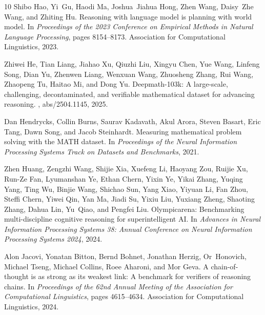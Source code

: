 \documentclass{article}
\begin{document}
{\begin{thebibliography}{10}
        Shibo Hao, Yi~Gu, Haodi Ma, Joshua~Jiahua Hong, Zhen Wang, Daisy~Zhe Wang, and Zhiting Hu.
        \newblock Reasoning with language model is planning with world model.
        \newblock In {\em Proceedings of the 2023 Conference on Empirical Methods in Natural Language Processing}, pages 8154--8173. Association for Computational Linguistics, 2023.
        
        Zhiwei He, Tian Liang, Jiahao Xu, Qiuzhi Liu, Xingyu Chen, Yue Wang, Linfeng Song, Dian Yu, Zhenwen Liang, Wenxuan Wang, Zhuosheng Zhang, Rui Wang, Zhaopeng Tu, Haitao Mi, and Dong Yu.
        \newblock Deepmath-103k: A large-scale, challenging, decontaminated, and verifiable mathematical dataset for advancing reasoning.
        , abs/2504.1145, 2025.
        
        Dan Hendrycks, Collin Burns, Saurav Kadavath, Akul Arora, Steven Basart, Eric Tang, Dawn Song, and Jacob Steinhardt.
        \newblock Measuring mathematical problem solving with the {MATH} dataset.
        \newblock In {\em Proceedings of the Neural Information Processing Systems Track on Datasets and Benchmarks}, 2021.
        
        Zhen Huang, Zengzhi Wang, Shijie Xia, Xuefeng Li, Haoyang Zou, Ruijie Xu, Run{-}Ze Fan, Lyumanshan Ye, Ethan Chern, Yixin Ye, Yikai Zhang, Yuqing Yang, Ting Wu, Binjie Wang, Shichao Sun, Yang Xiao, Yiyuan Li, Fan Zhou, Steffi Chern, Yiwei Qin, Yan Ma, Jiadi Su, Yixiu Liu, Yuxiang Zheng, Shaoting Zhang, Dahua Lin, Yu~Qiao, and Pengfei Liu.
        \newblock Olympicarena: Benchmarking multi-discipline cognitive reasoning for superintelligent {AI}.
        \newblock In {\em Advances in Neural Information Processing Systems 38: Annual Conference on Neural Information Processing Systems 2024}, 2024.
        
        Alon Jacovi, Yonatan Bitton, Bernd Bohnet, Jonathan Herzig, Or~Honovich, Michael Tseng, Michael Collins, Roee Aharoni, and Mor Geva.
        \newblock A chain-of-thought is as strong as its weakest link: {A} benchmark for verifiers of reasoning chains.
        \newblock In {\em Proceedings of the 62nd Annual Meeting of the Association for Computational Linguistics}, pages 4615--4634. Association for Computational Linguistics, 2024.
        

\end{thebibliography}}
\end{document}
